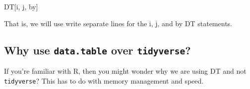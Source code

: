 \documentclass[]{book}
\newenvironment{Shaded}{\begin{snugshade}}{\end{snugshade}}
\newcommand{\NormalTok}[1]{#1}
\begin{document}
\begin{Shaded}
\begin{Highlighting}[]
\NormalTok{DT[i,}
\NormalTok{   j,}
\NormalTok{   by]}
\end{Highlighting}
\end{Shaded}

That is, we will use write separate lines for the i, j, and by DT statements.

\hypertarget{why-use-data.table-over-tidyverse}{%
\subsection{\texorpdfstring{Why use \texttt{data.table} over \texttt{tidyverse}?}{Why use data.table over tidyverse?}}\label{why-use-data.table-over-tidyverse}}

If you're familiar with R, then you might wonder why we are using DT and not \texttt{tidyverse}? This has to do with memory management and speed.
\end{document}
